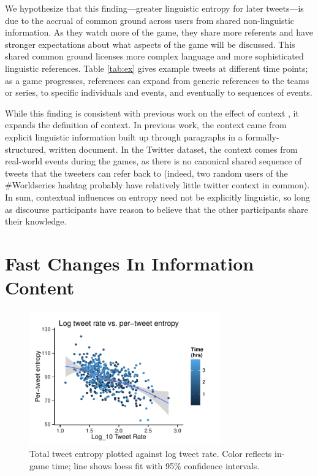 \documentclass[11pt,letterpaper]{article}
\begin{document}
We hypothesize that this finding---greater linguistic entropy for later tweets---is due to the accrual of common ground across users from shared non-linguistic information. As they watch more of the game, they share more referents and have stronger expectations about what aspects of the game will be discussed. This shared common ground licenses more complex language and more sophisticated linguistic references. Table \ref{tab:ex} gives example tweets at different time points; as a game progresses, references can expand from generic references to the teams or series, to specific individuals and events, and eventually to sequences of events.

While this finding is consistent with previous work on the effect of context \cite{genzel2002,qian2012}, it expands the definition of context.  In previous work, the context came from explicit linguistic information built up through paragraphs in a formally-structured, written document.  In the Twitter dataset, the context comes from real-world events during the games, as there is no canonical shared sequence of tweets that the tweeters can refer back to (indeed, two random users of the \#Worldseries hashtag probably have relatively little twitter context in common).  In sum, contextual influences on entropy need not be explicitly linguistic, so long as discourse participants have reason to believe that the other participants share their knowledge.

\section{Fast Changes In Information Content}

\begin{figure}
 \centering
  \includegraphics[width=3.25in]{figures/fig2.pdf}
 \caption{Total tweet entropy plotted against log tweet rate. Color reflects in-game time; line shows loess fit with 95\% confidence intervals.}\label{fig:lrate-tent}\vspace*{-.5em}
\end{figure}
\end{document}
